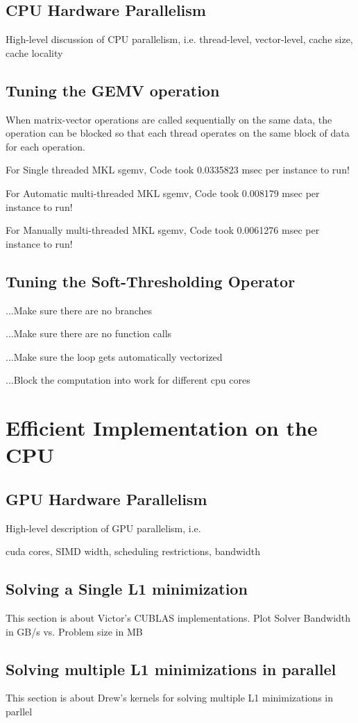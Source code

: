 \documentclass[10pt,twocolumn,letterpaper]{article}
\begin{document}
\subsection{CPU Hardware Parallelism}
High-level discussion of CPU parallelism, i.e.
thread-level, vector-level, cache size, cache locality
\subsection{Tuning the GEMV operation}
When matrix-vector operations are called sequentially on the same data,
the operation can be blocked so that each thread operates on the same block of data for each operation.

For Single threaded MKL sgemv, Code took          0.0335823 msec per instance to run!

For Automatic multi-threaded MKL sgemv, Code took 0.008179 msec per instance to run!

For Manually multi-threaded MKL sgemv, Code took  0.0061276 msec per instance to run!

\subsection{Tuning the Soft-Thresholding Operator}
...Make sure there are no branches

...Make sure there are no function calls

...Make sure the loop gets automatically vectorized

...Block the computation into work for different cpu cores

\section{Efficient Implementation on the CPU}
\subsection{GPU Hardware Parallelism}
High-level description of GPU parallelism, i.e.

cuda cores, SIMD width, scheduling restrictions, bandwidth
\subsection{Solving a Single L1 minimization}
This section is about Victor's CUBLAS implementations.
Plot Solver Bandwidth in GB/s vs. Problem size in MB

\subsection{Solving multiple L1 minimizations in parallel}
This section is about Drew's kernels for solving multiple L1 minimizations in parllel
\end{document}
